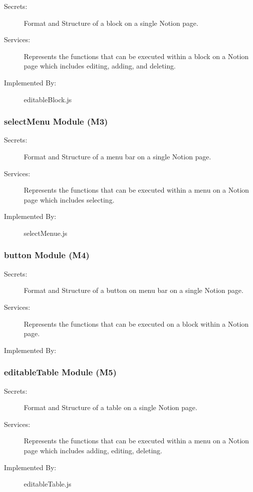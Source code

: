 \documentclass[12pt, titlepage]{article}
\begin{document}
\begin{description}
\item[Secrets:] Format and Structure of a block on a single Notion page.
\item[Services:] Represents the functions that can be executed within a block on a Notion page which includes editing, adding, and deleting.
\item[Implemented By:] editableBlock.js
\end{description}

\subsubsection{selectMenu Module (M3)}

\begin{description}
\item[Secrets:] Format and Structure of a menu bar on a single Notion page.
\item[Services:] Represents the functions that can be executed within a menu on a Notion page which includes selecting.
\item[Implemented By:] selectMenue.js
\end{description}

\subsubsection{button Module (M4)}

\begin{description}
\item[Secrets:] Format and Structure of a button on menu bar on a single Notion page.
\item[Services:] Represents the functions that can be executed on a block within a Notion page.
\item[Implemented By:] 
\end{description}

\subsubsection{editableTable Module (M5)}

\begin{description}
\item[Secrets:] Format and Structure of a table on a single Notion page.
\item[Services:] Represents the functions that can be executed within a menu on a Notion page which includes adding, editing, deleting.
\item[Implemented By:] editableTable.js
\end{description}
\end{document}
